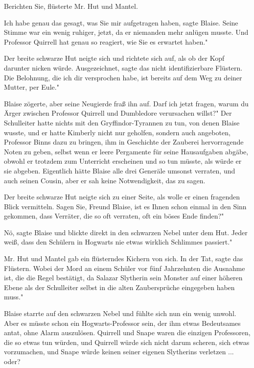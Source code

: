 \glqq Berichten Sie\grqq{}, flüsterte Mr. Hut und Mantel.

\glqq Ich habe genau das gesagt, was Sie mir aufgetragen haben\grqq{}, sagte
Blaise. Seine Stimme war ein wenig ruhiger, jetzt, da er niemanden mehr anlügen
musste. \glqq Und Professor Quirrell hat genau so reagiert, wie Sie es erwartet
haben."

Der breite schwarze Hut neigte sich und richtete sich auf, als ob der Kopf
darunter nicken würde. \glqq Ausgezeichnet\grqq{}, sagte das nicht
identifizierbare Flüstern. \glqq Die Belohnung, die ich dir versprochen habe,
ist bereits auf dem Weg zu deiner Mutter, per Eule."

Blaise zögerte, aber seine Neugierde fraß ihn auf. \glqq Darf ich jetzt fragen,
warum du Ärger zwischen Professor Quirrell und Dumbledore verursachen willst?"
Der Schulleiter hatte nichts mit den Gryffindor-Tyrannen zu tun, von denen
Blaise wusste, und er hatte Kimberly nicht nur geholfen, sondern auch angeboten,
Professor Binns dazu zu bringen, ihm in Geschichte der Zauberei hervorragende
Noten zu geben, selbst wenn er leere Pergamente für seine Hausaufgaben abgäbe,
obwohl er trotzdem zum Unterricht erscheinen und so tun müsste, als würde er sie
abgeben. Eigentlich hätte Blaise alle drei Generäle umsonst verraten, und auch
seinen Cousin, aber er sah keine Notwendigkeit, das zu sagen.

Der breite schwarze Hut neigte sich zu einer Seite, als wolle er einen fragenden
Blick vermitteln. \glqq Sagen Sie, Freund Blaise, ist es Ihnen schon einmal in
den Sinn gekommen, dass Verräter, die so oft verraten, oft ein böses Ende
finden?"

\glqq Nö\grqq{}, sagte Blaise und blickte direkt in den schwarzen Nebel unter
dem Hut. \glqq Jeder weiß, dass den Schülern in Hogwarts nie etwas wirklich
Schlimmes passiert."

Mr. Hut und Mantel gab ein flüsterndes Kichern von sich. \glqq In der
Tat\grqq{}, sagte das Flüstern. \glqq Wobei der Mord an einem Schüler vor fünf
Jahrzehnten die Ausnahme ist, die die Regel bestätigt, da Salazar Slytherin sein
Monster auf einer höheren Ebene als der Schulleiter selbst in die alten
Zaubersprüche eingegeben haben muss."

Blaise starrte auf den schwarzen Nebel und fühlte sich nun ein wenig unwohl.
Aber es müsste schon ein Hogwarts-Professor sein, der ihm etwas Bedeutsames
antat, ohne Alarm auszulösen. Quirrell und Snape waren die einzigen Professoren,
die so etwas tun würden, und Quirrell würde sich nicht darum scheren, sich etwas
vorzumachen, und Snape würde keinen seiner eigenen Slytherins verletzen ...
oder?

